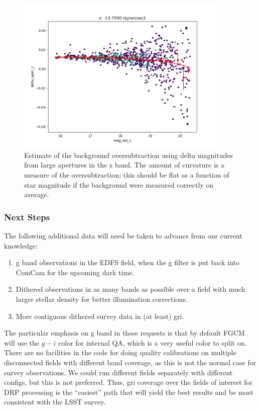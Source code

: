 \begin{figure}
  \begin{center}
    \includegraphics[width=0.9\textwidth]{photometric_calibration_figures/background_oversubtraction_z.png}
  \end{center}
  \caption{Estimate of the background oversubtraction using delta magnitudes
    from large apertures in the z band.  The amount of curvature is a measure
    of the oversubtraction; this should be flat as a function of star magnitude
    if the background were measured correctly on average.}
\end{figure}

\subsubsection{Next Steps}

The following additional data will need be taken to advance from our current
knowledge:

\begin{enumerate}
  \item{g band observations in the EDFS field, when the g filter is put back
    into ComCam for the upcoming dark time.}
  \item{Dithered observations in as many bands as possible over a field with
    much larger stellar density for better illumination corrections.}
  \item{More contiguous dithered survey data in (at least) gri.}
\end{enumerate}

The particular emphasis on g band in these requests is that by default FGCM
will use the $g-i$ color for internal QA, which is a very useful color to split
on.  There are no facilities in the code for doing quality calibrations on
multiple disconnected fields with different band coverage, as this is not the
normal case for survey observations.  We could run different fields separately
with different configs, but this is not preferred.  Thus, gri coverage over the
fields of interest for DRP processing is the ``easiest'' path that will yield
the best results and be most consistent with the LSST survey.


